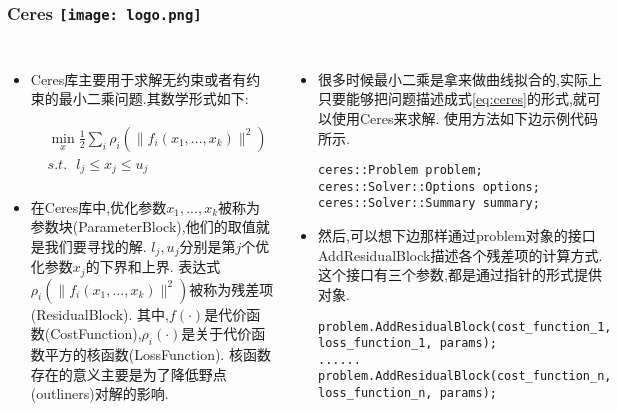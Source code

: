 \begin{comment}
\end{comment}
\begin{frame}[fragile]
\frametitle{Ceres \hfill \texttt{[image: logo.png]}}
\begin{columns}
	\begin{itemize}
		\item Ceres库主要用于求解无约束或者有约束的最小二乘问题.其数学形式如下:

		
		\begin{equation}\label{eq:ceres}
		\begin{split}
		& \mathop{\min}_{x} \frac{1}{2} \sum_i \rho_i(\| f_i(x_1, ..., x_k) \|^2) \\
		& s.t. \ \ \ l_j \leq x_j \leq u_j \\
		\end{split}
		\end{equation}
		\vspace{0.2cm}
		\item 在Ceres库中,优化参数$x_1, ..., x_k$被称为{\color{red}参数块(ParameterBlock)},他们的取值就是我们要寻找的解.
		$l_j, u_j$分别是第$j$个优化参数$x_j$的下界和上界.
		表达式$\rho_i(\| f_i(x_1, ..., x_k) \|^2)$被称为{\color{red}残差项(ResidualBlock)}.
		其中,$f(\cdot)$是{\color{red}代价函数(CostFunction)},$\rho_i(\cdot)$是关于代价函数平方的{\color{red}核函数(LossFunction)}.
		核函数存在的意义主要是为了降低野点(outliners)对解的影响.
	\end{itemize}
	\begin{itemize}
		\item 很多时候最小二乘是拿来做曲线拟合的,实际上只要能够把问题描述成式\ref{eq:ceres}的形式,就可以使用Ceres来求解.
		使用方法如下边示例代码所示.
\vspace{0.3cm}
\begin{lstlisting}[frame=shadowbox]  
ceres::Problem problem;
ceres::Solver::Options options;
ceres::Solver::Summary summary;
\end{lstlisting}

		\item 然后,可以想下边那样通过problem对象的接口AddResidualBlock描述各个残差项的计算方式.
		这个接口有三个参数,都是通过指针的形式提供对象.
\begin{lstlisting}[frame=shadowbox]		
problem.AddResidualBlock(cost_function_1, loss_function_1, params);
......
problem.AddResidualBlock(cost_function_n, loss_function_n, params);
\end{lstlisting}

	\end{itemize}

\end{columns}
\end{frame}

